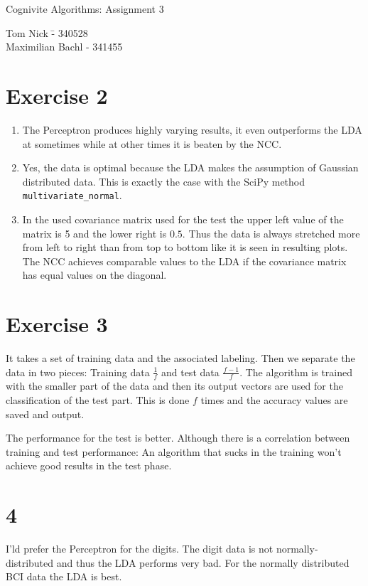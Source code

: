\documentclass[a4paper,10pt]{article}
\begin{document}
\begin{center}
\Large{Cognivite Algorithms: Assignment 3} \\
\end{center}
\begin{tabbing}
Tom Nick \hspace{2cm}\= - 340528\\
Maximilian Bachl \> - 341455 \\
\end{tabbing}

\section*{Exercise 2}
\begin{enumerate}
    \item The Perceptron produces highly varying results, it even outperforms the LDA at sometimes while at other times it is beaten by the NCC. 
    \item Yes, the data is optimal because the LDA makes the assumption of Gaussian distributed data. This is exactly the case with the SciPy method \texttt{multivariate\_normal}.
    \item In the used covariance matrix used for the test the upper left value of the matrix is 5 and the lower right is $0.5$. Thus the data is always stretched more from left to right than from top to bottom like it is seen in resulting plots. The NCC achieves comparable values to the LDA if the covariance matrix has equal values on the diagonal.
\end{enumerate}
\section*{Exercise 3}
It takes a set of training data and the associated labeling. Then we separate the data in two pieces: Training data $\frac 1 f$ and test data $\frac {f-1} {f}$. The algorithm is trained with the smaller part of the data and then its output vectors are used for the classification of the test part. This is done $f$ times and the accuracy values are saved and output.

The performance for the test is better. Although there is a correlation between training and test performance: An algorithm that sucks in the training won't achieve good results in the test phase.
\section*{4}
I'ld prefer the Perceptron for the digits. The digit data is not normally-distributed and thus the LDA performs very bad. 
For the normally distributed BCI data the LDA is best.\\
\end{document}
